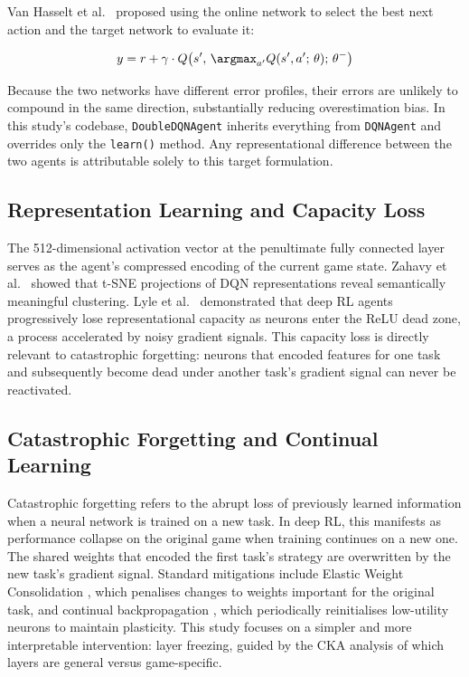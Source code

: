 \documentclass[a4paper]{article}
\begin{document}
Van Hasselt et al.\ \cite{van2016deep} proposed using the online network to select the best next action and the target network to evaluate it:

\begin{equation}
    y = r + \gamma \cdot Q\!\left(s',\, \argmax_{a'} Q(s', a';\, \theta);\, \theta^{-}\right)
\end{equation}

Because the two networks have different error profiles, their errors are unlikely to compound in the same direction, substantially reducing overestimation bias. In this study's codebase, \texttt{DoubleDQNAgent} inherits everything from \texttt{DQNAgent} and overrides only the \texttt{learn()} method. Any representational difference between the two agents is attributable solely to this target formulation.

\subsection{Representation Learning and Capacity Loss}

The 512-dimensional activation vector at the penultimate fully connected layer serves as the agent's compressed encoding of the current game state. Zahavy et al.\ \cite{zahavy2016graying} showed that t-SNE projections of DQN representations reveal semantically meaningful clustering. Lyle et al.\ \cite{lyle2022understanding} demonstrated that deep RL agents progressively lose representational capacity as neurons enter the ReLU dead zone, a process accelerated by noisy gradient signals. This capacity loss is directly relevant to catastrophic forgetting: neurons that encoded features for one task and subsequently become dead under another task's gradient signal can never be reactivated.

\subsection{Catastrophic Forgetting and Continual Learning}

Catastrophic forgetting \cite{mccloskey1989catastrophic} refers to the abrupt loss of previously learned information when a neural network is trained on a new task. In deep RL, this manifests as performance collapse on the original game when training continues on a new one. The shared weights that encoded the first task's strategy are overwritten by the new task's gradient signal. Standard mitigations include Elastic Weight Consolidation \cite{kirkpatrick2017overcoming}, which penalises changes to weights important for the original task, and continual backpropagation \cite{elsayed2024continual}, which periodically reinitialises low-utility neurons to maintain plasticity. This study focuses on a simpler and more interpretable intervention: layer freezing, guided by the CKA analysis of which layers are general versus game-specific.
\end{document}
